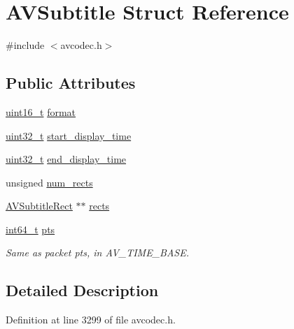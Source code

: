 \hypertarget{struct_a_v_subtitle}{}\section{A\+V\+Subtitle Struct Reference}
\label{struct_a_v_subtitle}


{\ttfamily \#include $<$avcodec.\+h$>$}

\subsection*{Public Attributes}
\begin{DoxyCompactItemize}
\item 
\hyperlink{lib-src_2ffmpeg_2win32_2stdint_8h_a30af71eaf40c925c9832eb289a48da35}{uint16\+\_\+t} \hyperlink{struct_a_v_subtitle_a03cabc402df10e7ee9b92df6284b09c1}{format}
\item 
\hyperlink{lib-src_2ffmpeg_2win32_2stdint_8h_a6eb1e68cc391dd753bc8ce896dbb8315}{uint32\+\_\+t} \hyperlink{struct_a_v_subtitle_a271f635c9e734310a43277f819159c68}{start\+\_\+display\+\_\+time}
\item 
\hyperlink{lib-src_2ffmpeg_2win32_2stdint_8h_a6eb1e68cc391dd753bc8ce896dbb8315}{uint32\+\_\+t} \hyperlink{struct_a_v_subtitle_a354cdfa51cda54c914a569ee3f7493c0}{end\+\_\+display\+\_\+time}
\item 
unsigned \hyperlink{struct_a_v_subtitle_a89491b1f6998eceb6221791fd50087df}{num\+\_\+rects}
\item 
\hyperlink{struct_a_v_subtitle_rect}{A\+V\+Subtitle\+Rect} $\ast$$\ast$ \hyperlink{struct_a_v_subtitle_ad37c2315a9e36ed700f64cb971e22298}{rects}
\item 
\hyperlink{lib-src_2ffmpeg_2win32_2stdint_8h_a67a9885ef4908cb72ce26d75b694386c}{int64\+\_\+t} \hyperlink{struct_a_v_subtitle_af7cc390bba4f9d6c32e391ca59d117a2}{pts}
\begin{DoxyCompactList}\small\item\em Same as packet pts, in A\+V\+\_\+\+T\+I\+M\+E\+\_\+\+B\+A\+SE. \end{DoxyCompactList}\end{DoxyCompactItemize}


\subsection{Detailed Description}


Definition at line 3299 of file avcodec.\+h.



